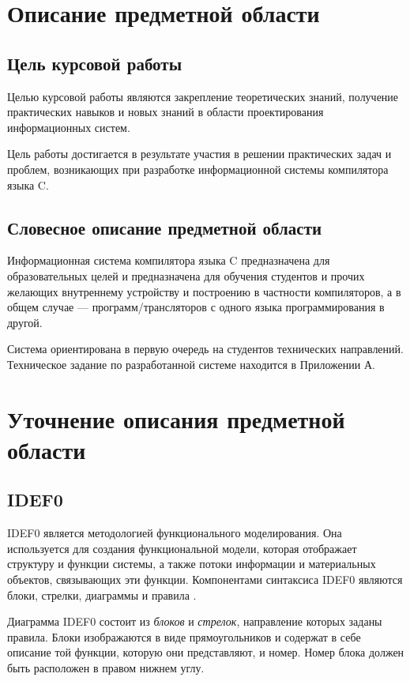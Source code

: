 \documentclass[14pt,russian]{extarticle}
\newcommand*\obj[1]{\textit{#1}}
\begin{document}
\clearpage
\section{Описание предметной области}

\subsection{Цель курсовой работы}

Целью курсовой работы являются закрепление теоретических знаний, получение
практических навыков и новых знаний в области проектирования информационных
систем.

Цель работы достигается в результате участия в решении практических задач и
проблем, возникающих при разработке информационной системы компилятора языка C.

\subsection{Словесное описание предметной области}

Информационная система компилятора языка C предназначена для образовательных
целей и предназначена для обучения студентов и прочих желающих внутреннему
устройству и построению в частности компиляторов, а в общем случае ---
программ\-/трансляторов с одного языка программирования в другой.

Система ориентирована в первую очередь на студентов технических направлений.
Техническое задание по разработанной системе находится в Приложении А.

\clearpage
\section{Уточнение описания предметной области}

\subsection{IDEF0}

IDEF0 является методологией функционального моделирования. Она используется для
создания функциональной модели, которая отображает структуру и функции системы,
а также потоки информации и материальных объектов, связывающих эти функции.
Компонентами синтаксиса IDEF0 являются блоки, стрелки, диаграммы и правила
\cite{defense1}.

Диаграмма IDEF0 состоит из \obj{блоков} и \obj{стрелок}, направление которых
заданы правила. Блоки изображаются в виде прямоугольников и содержат в себе
описание той функции, которую они представляют, и номер. Номер блока должен быть
расположен в правом нижнем углу.
\end{document}
